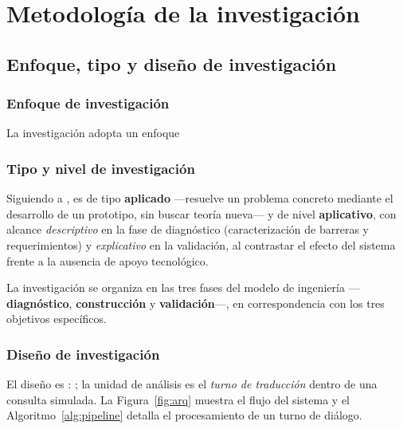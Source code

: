 \clearpage
\section{Metodolog{\'i}a de la investigaci{\'o}n}

\subsection{Enfoque, tipo y dise{\~n}o de investigaci{\'o}n}

\subsubsection{Enfoque de investigaci{\'o}n}
La investigaci{\'o}n adopta un enfoque \textbf{} 

\subsubsection{Tipo y nivel de investigaci{\'o}n}
Siguiendo a \textcite{hernandez2018metodologia}, es de tipo \textbf{aplicado} ---resuelve un
problema concreto mediante el desarrollo de un prototipo, sin buscar teor{\'i}a nueva--- y de nivel
\textbf{aplicativo}, con alcance \emph{descriptivo} en la fase de diagn{\'o}stico (caracterizaci{\'o}n
de barreras y requerimientos) y \emph{explicativo} en la validaci{\'o}n, al contrastar el efecto del
sistema frente a la ausencia de apoyo tecnol{\'o}gico.

La investigaci{\'o}n se organiza en las tres
fases del modelo de ingenier{\'i}a ---\textbf{diagn{\'o}stico}, \textbf{construcci{\'o}n} y
\textbf{validaci{\'o}n}---, en correspondencia con los tres objetivos espec{\'i}ficos.

\subsubsection{Dise{\~n}o de investigaci{\'o}n}
El dise{\~n}o es \textbf{}: ; la unidad de an{\'a}lisis es el \emph{turno de traducci{\'o}n} dentro de una
consulta simulada. La Figura~\ref{fig:arq} muestra el flujo del sistema y el
Algoritmo~\ref{alg:pipeline} detalla el procesamiento de un turno de di{\'a}logo.

